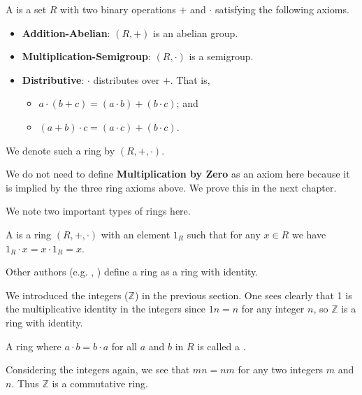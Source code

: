 \begin{definition}
    A  is a set $R$ with two binary operations $+$ and $\cdot$ satisfying the following axioms.
    \begin{itemize}
        \item \textbf{Addition-Abelian}: $(R, +)$ is an abelian group.
        \item \textbf{Multiplication-Semigroup}: $(R, \cdot)$ is a semigroup.
        \item \textbf{Distributive}: $\cdot$ distributes over $+$. That is,
        \begin{itemize}
            \item $a \cdot (b + c) = (a \cdot b) + (b \cdot c)$; and
            \item $(a + b) \cdot c = (a \cdot c) + (b \cdot c)$.
        \end{itemize}
    \end{itemize}
    We denote such a ring by $(R, +, \cdot)$.
\end{definition}
\begin{remark}
    We do not need to define \textbf{Multiplication by Zero} as an axiom here because it is implied by the three ring axioms above. We prove this in the next chapter.
\end{remark}

We note two important types of rings here.
\begin{definition}
    A  is a ring $(R, +, \cdot)$ with an element $1_R$ such that for any $x \in R$ we have $1_R \cdot x = x \cdot 1_R = x$.
\end{definition}
\begin{remark}
    Other authors (e.g. \cite[p.~136]{cohn_1982}, \cite[pp.~145--146]{clark_1984}) define a ring as a ring with identity.
\end{remark}
\begin{example}
    We introduced the integers ($\mathbb{Z}$) in the previous section. One sees clearly that 1 is the multiplicative identity in the integers since $1n = n$ for any integer $n$, so $\mathbb{Z}$ is a ring with identity.
\end{example}

\begin{definition}
    A ring where $a \cdot b = b \cdot a$ for all $a$ and $b$ in $R$ is called a .
\end{definition}
\begin{example}
    Considering the integers again, we see that $mn = nm$ for any two integers $m$ and $n$. Thus $\mathbb{Z}$ is a commutative ring.
\end{example}

